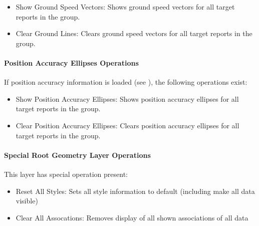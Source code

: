 \begin{itemize}
 \item Show Ground Speed Vectors: Shows ground speed vectors for all target reports in the group.
 \item Clear Ground Lines: Clears ground speed vectors for all target reports in the group.
\end{itemize} 

\paragraph{Position Accuracy Ellipses Operations}
If position accuracy information is loaded (see ), the following operations exist:

\begin{itemize}
 \item Show Position Accuracy Ellipses: Shows position accuracy ellipses for all target reports in the group.
 \item Clear Position Accuracy Ellipses: Clears position accuracy ellipses for all target reports in the group.
\end{itemize} 

\paragraph{Special Root Geometry Layer Operations}
This layer has special operation present:

\begin{itemize}
 \item Reset All Styles: Sets all style information to default (including make all data visible)
 \item Clear All Assocations: Removes display of all shown associations of all data
\end{itemize} 
